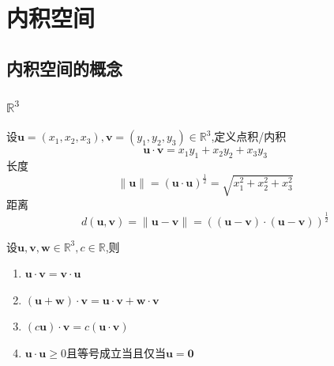 \chapter{内积空间}
\section{内积空间的概念}
\subsection{$\mathbb{R}^3$}
\begin{formal}
    \begin{definition}[三维空间中向量的点积定义]\label{def:三维空间中向量的点积定义}
设$\bm{u}=\left(x_1,x_2,x_3\right),\bm{v}=\left(y_1,y_2,y_3\right)\in\mathbb{R}^3$,定义点积/内积\[
\bm{u}\cdot\bm{v}=x_1y_1+x_2y_2+x_3y_3
\]长度\[
\left\lVert \bm{u}\right\rVert =\left(\bm{u}\cdot\bm{u}\right)^{\frac{1}{2}}=\sqrt{x_1^2+x_2^2+x_3^2}
\]     距离\[
d\left(
\bm{u},\bm{v}
\right)=\left\lVert \bm{u}-\bm{v}\right\rVert =\left(
    \left(
        \bm{u}-\bm{v}
    \right)\cdot\left(
        \bm{u}-\bm{v}
    \right)
\right)^{\frac{1}{2}}
\]
    \end{definition}
\end{formal}
\begin{formal}
    \begin{proposition}[三维空间中向量的点积的性质]\label{prop:三维空间中向量的点积的性质}
        设$\bm{u},\bm{v},\bm{w}\in\mathbb{R}^3,c\in\mathbb{R}$,则\begin{enumerate}[label={\textup{(\arabic*)}}]
            \item $\bm{u}\cdot\bm{v}=\bm{v}\cdot\bm{u}$
            \item $\left(\bm{u}+\bm{w}\right)\cdot\bm{v}=\bm{u}\cdot\bm{v}+\bm{w}\cdot\bm{v}$
            \item $\left(c\bm{u}\right)\cdot\bm{v}=c\left(\bm{u}\cdot\bm{v}\right)$
            \item $\bm{u}\cdot\bm{u}\geqslant 0$且等号成立当且仅当$\bm{u}=\bm{0}$
        \end{enumerate}
    \end{proposition}
\end{formal}
